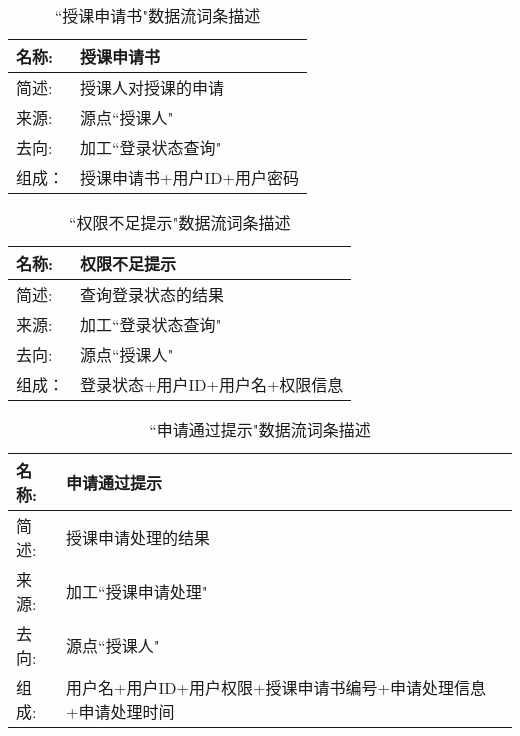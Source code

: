 \begin{table}[H]  
\caption{``授课申请书"数据流词条描述}  
\begin{center}  
    \begin{tabular}{l p{11cm}} 
        \hline
        \quad 名称: & 授课申请书 \\
        \hline
        \quad 简述: & 授课人对授课的申请 \\
        \hline
        \quad 来源: & 源点``授课人" \\
        \hline
        \quad 去向: & 加工``登录状态查询" \\
        \hline
        \quad 组成： & 授课申请书+用户ID+用户密码 \\
        \hline
    \end{tabular}
    \label{tab1}
\end{center}
\end{table}

\begin{table}[H]  
\caption{``权限不足提示"数据流词条描述}  
\begin{center}  
    \begin{tabular}{l p{11cm}} 
        \hline
        \quad 名称: & 权限不足提示 \\
        \hline
        \quad 简述: & 查询登录状态的结果 \\
        \hline
        \quad 来源: & 加工``登录状态查询" \\
        \hline
        \quad 去向: & 源点``授课人" \\
        \hline
        \quad 组成： & 登录状态+用户ID+用户名+权限信息 \\
        \hline
    \end{tabular}
    \label{tab1}
\end{center}
\end{table}


\begin{table}[H]  
\caption{``申请通过提示"数据流词条描述}  
\begin{center}  
    \begin{tabular}{l p{11cm}} 
        \hline
        \quad 名称: & 申请通过提示 \\
        \hline
        \quad 简述: & 授课申请处理的结果 \\
        \hline
        \quad 来源: & 加工``授课申请处理" \\
        \hline
        \quad 去向: & 源点``授课人" \\
        \hline
        \quad 组成: & 用户名+用户ID+用户权限+授课申请书编号+申请处理信息+申请处理时间 \\
        \hline
    \end{tabular}
    \label{tab1}
\end{center}
\end{table}


